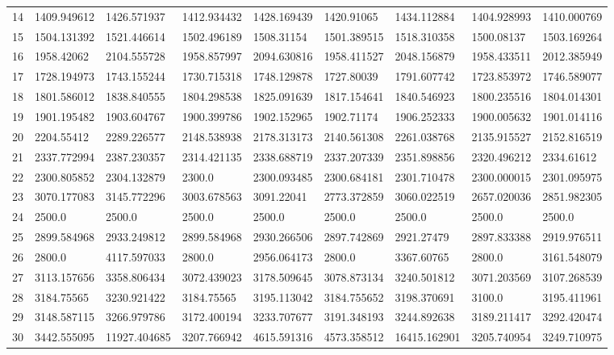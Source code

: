 \begin{table*}[t]
\begin{tabular}{|p{0.8cm}|p{1.6cm}|p{1.6cm}|p{1.6cm}|p{1.6cm}|p{1.6cm}|p{1.6cm}|p{1.6cm}|p{1.6cm}|}
14  & 1409.949612 & 1426.571937 & 1412.934432 & 1428.169439 & 1420.91065 & 1434.112884 & 1404.928993 & 1410.000769 \\ 
15  & 1504.131392 & 1521.446614 & 1502.496189 & 1508.31154 & 1501.389515 & 1518.310358 & 1500.08137 & 1503.169264 \\ 
16  & 1958.42062 & 2104.555728 & 1958.857997 & 2094.630816 & 1958.411527 & 2048.156879 & 1958.433511 & 2012.385949 \\ 
17  & 1728.194973 & 1743.155244 & 1730.715318 & 1748.129878 & 1727.80039 & 1791.607742 & 1723.853972 & 1746.589077 \\ 
18  & 1801.586012 & 1838.840555 & 1804.298538 & 1825.091639 & 1817.154641 & 1840.546923 & 1800.235516 & 1804.014301 \\ 
19  & 1901.195482 & 1903.604767 & 1900.399786 & 1902.152965 & 1902.71174 & 1906.252333 & 1900.005632 & 1901.014116 \\ 
20  & 2204.55412 & 2289.226577 & 2148.538938 & 2178.313173 & 2140.561308 & 2261.038768 & 2135.915527 & 2152.816519 \\ 
21  & 2337.772994 & 2387.230357 & 2314.421135 & 2338.688719 & 2337.207339 & 2351.898856 & 2320.496212 & 2334.61612 \\ 
22  & 2300.805852 & 2304.132879 & 2300.0 & 2300.093485 & 2300.684181 & 2301.710478 & 2300.000015 & 2301.095975 \\ 
23  & 3070.177083 & 3145.772296 & 3003.678563 & 3091.22041 & 2773.372859 & 3060.022519 & 2657.020036 & 2851.982305 \\ 
24  & 2500.0 & 2500.0 & 2500.0 & 2500.0 & 2500.0 & 2500.0 & 2500.0 & 2500.0 \\ 
25  & 2899.584968 & 2933.249812 & 2899.584968 & 2930.266506 & 2897.742869 & 2921.27479 & 2897.833388 & 2919.976511 \\ 
26  & 2800.0 & 4117.597033 & 2800.0 & 2956.064173 & 2800.0 & 3367.60765 & 2800.0 & 3161.548079 \\ 
27  & 3113.157656 & 3358.806434 & 3072.439023 & 3178.509645 & 3078.873134 & 3240.501812 & 3071.203569 & 3107.268539 \\ 
28  & 3184.75565 & 3230.921422 & 3184.75565 & 3195.113042 & 3184.755652 & 3198.370691 & 3100.0 & 3195.411961 \\ 
29  & 3148.587115 & 3266.979786 & 3172.400194 & 3233.707677 & 3191.348193 & 3244.892638 & 3189.211417 & 3292.420474 \\ 
30  & 3442.555095 & 11927.404685 & 3207.766942 & 4615.591316 & 4573.358512 & 16415.162901 & 3205.740954 & 3249.710975 \\
\hline

\end{tabular}
\end{table*}

